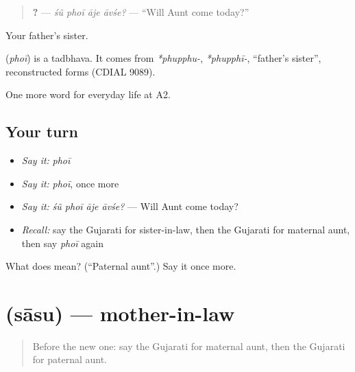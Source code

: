 \begin{quote}
\textbf{   ?} — \emph{śũ phoī āje āvśe?} — \textquotedblleft{}Will Aunt come today?\textquotedblright{}
\end{quote}

Your father's sister.

\begin{cousinweb}
\textbf{} (\emph{phoī}) is a tadbhava. It comes from \emph{*phupphu-}, \emph{*phupphī-}, \textquotedblleft{}father's sister\textquotedblright{}, reconstructed forms (CDIAL 9089).
\end{cousinweb}

\begin{grammarlens}[title={What you've built}]
One more word for everyday life at A2.
\end{grammarlens}

\subsection*{Your turn}
\begin{itemize}
\raggedright
  \item \emph{Say it:} \emph{phoī}
  \item \emph{Say it:} \emph{phoī}, once more
  \item \emph{Say it:} \emph{śũ phoī āje āvśe?} — Will Aunt come today?
  \item \emph{Recall:} say the Gujarati for sister-in-law, then the Gujarati for maternal aunt, then say \emph{phoī} again
\end{itemize}

\begin{tcolorbox}[breakable,colback=teal!4,colframe=teal!35!black,title={Before you move on}]
What does  mean? (\textquotedblleft{}Paternal aunt\textquotedblright{}.) Say it once more.
\end{tcolorbox}
\section[\texorpdfstring{\gu{સાસુ} (sāsu)}{સાસુ (sāsu)}]{ (sāsu) — mother-in-law}

\label{lesson:GU-C263-sasu}



\begin{quote}
Before the new one: say the Gujarati for maternal aunt, then the Gujarati for paternal aunt.
\end{quote}

